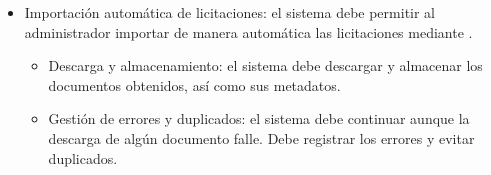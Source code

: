 \begin{itemize}
\begin{itemize}
		\item {} Borrar consultas: los usuarios podrán borrar consultas del historial.
	\end{itemize}
	\item {} Importación automática de licitaciones: el sistema debe permitir al administrador importar de manera automática las licitaciones mediante .
	\begin{itemize}
	\tightlist
		\item {} Descarga y almacenamiento: el sistema debe descargar y almacenar los documentos obtenidos, así como sus metadatos.
		\item {} Gestión de errores y duplicados: el sistema debe continuar aunque la descarga de algún documento falle. Debe registrar los errores y evitar duplicados.
	\end{itemize}
\end{itemize}

